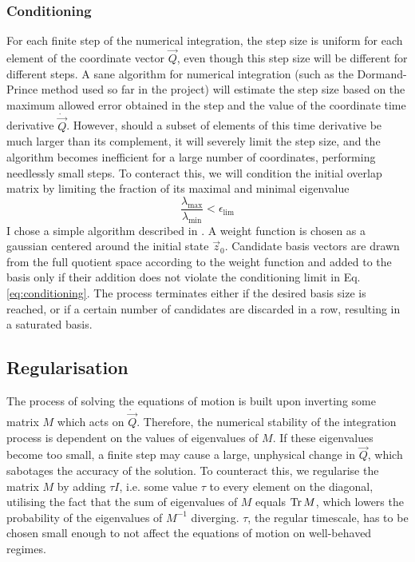 \documentclass[12pt]{article}
\begin{document}
	\subsubsection{Conditioning}
	For each finite step of the numerical integration, the step size is uniform for each element of the coordinate vector $\vec{Q}$, even though this step size will be different for different steps. A sane algorithm for numerical integration (such as the Dormand-Prince method used so far in the project) will estimate the step size based on the maximum allowed error obtained in the step and the value of the coordinate time derivative $\dot{\vec{Q}}$. However, should a subset of elements of this time derivative be much larger than its complement, it will severely limit the step size, and the algorithm becomes inefficient for a large number of coordinates, performing needlessly small steps. To conteract this, we will condition the initial overlap matrix by limiting the fraction of its maximal and minimal eigenvalue
	\begin{equation}\label{eq:conditioning}
	\frac{\lambda_{\text{max}}}{\lambda_{\text{min}}}<\epsilon_{\text{lim}}
	\end{equation}
	I chose a simple algorithm described in \cite{sampling_algorithm}. A weight function is chosen as a gaussian centered around the initial state $\vec{z}_0$. Candidate basis vectors are drawn from the full quotient space according to the weight function and added to the basis only if their addition does not violate the conditioning limit in Eq. \ref{eq:conditioning}. The process terminates either if the desired basis size is reached, or if a certain number of candidates are discarded in a row, resulting in a saturated basis.
	
	\subsection{Regularisation}
	
	The process of solving the equations of motion is built upon inverting some matrix $M$ which acts on $\dot{\vec{Q}}$. Therefore, the numerical stability of the integration process is dependent on the values of eigenvalues of $M$. If these eigenvalues become too small, a finite step may cause a large, unphysical change in $\vec{Q}$, which sabotages the accuracy of the solution. To counteract this, we regularise the matrix $M$ by adding $\tau I$, i.e. some value $\tau$ to every element on the diagonal, utilising the fact that the sum of eigenvalues of $M$ equals $\Tr M$, which lowers the probability of the eigenvalues of $M^{-1}$ diverging. $\tau$, the regular timescale, has to be chosen small enough to not affect the equations of motion on well-behaved regimes.
	
\end{document}
